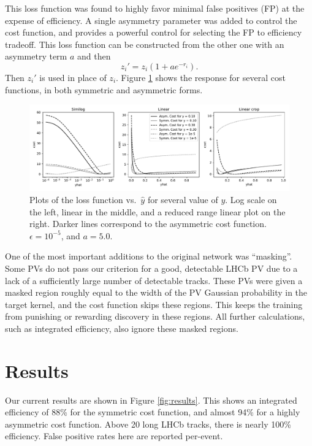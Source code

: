 \documentclass[a4paper]{jpconf}
\begin{document}
This loss function was found to highly favor minimal false positives (FP) at the expense of efficiency. A single asymmetry parameter was added to control the cost function, and provides a powerful control for selecting the FP to efficiency tradeoff. This loss function can be constructed from the other one with an asymmetry term $a$ and then
\begin{equation}
z_i' = z_i \left(
1+a e^{-r_i}
\right).
\end{equation}
Then $z_i'$ is used in place of $z_i$.
Figure \ref{fig:loss} shows the response for several cost functions, in both symmetric and asymmetric forms.


\begin{figure}
	\centering
	\includegraphics[width=\textwidth]{images/LossPaper.pdf}
	\caption{Plots of the loss function vs.\ $\hat y$ for several value of $y$. Log scale on the left, linear in the middle, and a reduced range linear plot on the right. Darker lines correspond to the asymmetric cost function. $\epsilon=10^{-5}$, and $a=5.0$.}
	\label{fig:loss}
\end{figure}

One of the most important additions to the original network was ``masking''. Some PVs do not pass our criterion for a good, detectable LHCb PV due to a lack of a sufficiently large number of detectable tracks. These PVs were given a masked region roughly equal to the width of the PV Gaussian probability in the target kernel, and the cost function skips these regions. This keeps the training from punishing or rewarding discovery in these regions. All further calculations, such as integrated efficiency, also ignore these masked regions.

\section{Results}

Our current results are shown in Figure \ref{fig:results}. This shows an integrated efficiency of 88\% for the symmetric cost function, and almost 94\% for a highly asymmetric cost function. Above 20 long LHCb tracks, there is nearly 100\% efficiency. False positive rates here are reported per-event.
\end{document}
